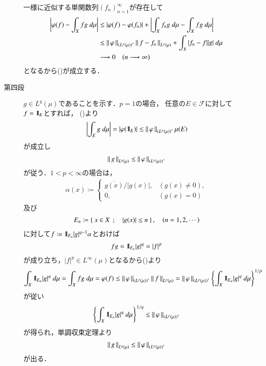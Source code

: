\begin{prf}
\begin{description}
				一様に近似する単関数列$(f_n)_{n=1}^\infty$が存在して
				\begin{align}
					\left| \varphi(f) - \int_X fg\ d\mu \right|
					&\leq \left| \varphi(f) - \varphi(f_n) \right| + \left| \int_X f_ng\ d\mu - \int_X fg\ d\mu \right| \\
					&\leq \left\|\, \varphi\, \right\|_{\left( L^p(\mu) \right)^*} \left\|\, f - f_n\, \right\|_{L^p(\mu)}
						+ \int_X |f_n - f||g|\ d\mu \\
					&\longrightarrow 0 \quad (n \longrightarrow \infty)
				\end{align}
				となるから()が成立する．
			
			\item[第四段]
				$g \in L^q(\mu)$であることを示す．$p = 1$の場合，
				任意の$E \in \mathscr{F}$に対して$f = \mbox{1}\hspace{-0.25em}\mbox{l}_E$とすれば，
				()より
				\begin{align}
					\left| \int_E g\ d\mu \right| = \left| \varphi(\mbox{1}\hspace{-0.25em}\mbox{l}_E) \right|
					\leq \left\|\, \varphi\, \right\|_{\left( L^p(\mu) \right)^*} \mu(E)
				\end{align}
				が成立し
				\begin{align}
					\left\|\, g\, \right\|_{L^q(\mu)} \leq \left\|\, \varphi\, \right\|_{\left( L^p(\mu) \right)^*}
					\label{eq:thm_dual_space_of_L_p_4}
				\end{align}
				が従う．$1 < p < \infty$の場合は，
				\begin{align}
					\alpha(x) \coloneqq
					\begin{cases}
						\overline{g(x)}/|g(x)|, & (g(x) \neq 0), \\
						0, & (g(x) = 0)
					\end{cases}
				\end{align}
				及び
				\begin{align}
					E_n \coloneqq \left\{\ x \in X\ \, ; \quad |g(x)| \leq n\ \right\},
					\quad (n=1,2,\cdots)
				\end{align}
				に対して$f \coloneqq \mbox{1}\hspace{-0.25em}\mbox{l}_{E_n} |g|^{q-1} \alpha$とおけば
				\begin{align}
					fg = \mbox{1}\hspace{-0.25em}\mbox{l}_{E_n} |g|^q = |f|^p
				\end{align}
				が成り立ち，$|f|^p \in L^\infty(\mu)$となるから()より
				\begin{align}
					\int_X \mbox{1}\hspace{-0.25em}\mbox{l}_{E_n} |g|^q\ d\mu
					= \int_X fg\ d\mu
					= \varphi(f)
					\leq \left\|\, \varphi\, \right\|_{\left( L^p(\mu) \right)^*} \left\|\, f\, \right\|_{L^p(\mu)}
					= \left\|\, \varphi\, \right\|_{\left( L^p(\mu) \right)^*} \left\{ \int_X \mbox{1}\hspace{-0.25em}\mbox{l}_{E_n} |g|^q\ d\mu \right\}^{1/p}
				\end{align}
				が従い
				\begin{align}
					\left\{ \int_X \mbox{1}\hspace{-0.25em}\mbox{l}_{E_n} |g|^q\ d\mu \right\}^{1/q} \leq \left\|\, \varphi\, \right\|_{\left( L^p(\mu) \right)^*}
				\end{align}
				が得られ，単調収束定理より
				\begin{align}
					\left\|\, g\, \right\|_{L^q(\mu)} \leq \left\|\, \varphi\, \right\|_{\left( L^p(\mu) \right)^*}
					\label{eq:thm_dual_space_of_L_p_5}
				\end{align}
				が出る．
				

\end{description}
\end{prf}

